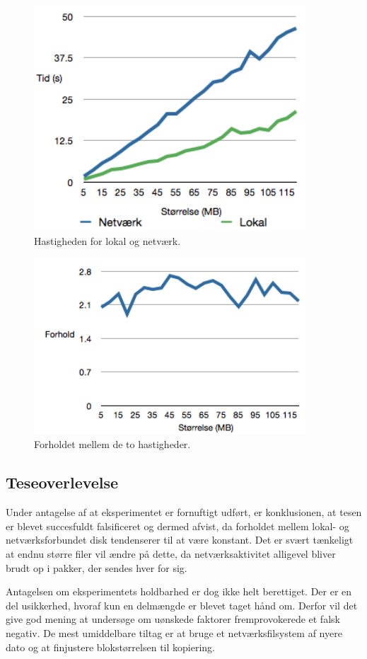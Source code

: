 \documentclass{article}
\begin{document}
\begin{figure}
	\includegraphics[width=4in]{ploto.png}
	\caption{Hastigheden for lokal og netværk.}
	\label{ploto}
\end{figure}

\begin{figure}
	\includegraphics[width=4in]{plotforhold.png}
	\caption{Forholdet mellem de to hastigheder.}
	\label{plotforhold}
\end{figure}

\subsection{Teseoverlevelse}
Under antagelse af at eksperimentet er fornuftigt udført, er konklusionen, at tesen er blevet succesfuldt falsificeret og dermed afvist, da forholdet mellem lokal- og netværksforbundet disk tendenserer til at være konstant. Det er svært tænkeligt at endnu større filer vil ændre på dette, da netværksaktivitet alligevel bliver brudt op i pakker, der sendes hver for sig.

Antagelsen om eksperimentets holdbarhed er dog ikke helt berettiget. Der er en del usikkerhed, hvoraf kun en delmængde er blevet taget hånd om. Derfor vil det give god mening at undersøge om uønskede faktorer fremprovokerede et falsk negativ. De mest umiddelbare tiltag er at bruge et netværksfilsystem af nyere dato og at finjustere blokstørrelsen til kopiering.
\end{document}
